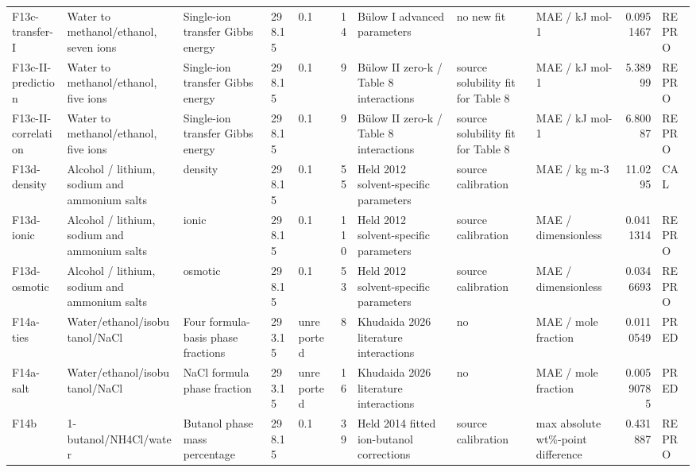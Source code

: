 \begin{landscape}
\begin{longtable}{L{1.9cm}L{2.5cm}L{2.1cm}L{1.6cm}L{1.6cm}rL{2.4cm}L{1.9cm}L{2.2cm}rL{1cm}}
F13c-\allowbreak{}transfer-\allowbreak{}I & Water to methanol/\allowbreak{}ethanol, seven ions & Single-\allowbreak{}ion transfer Gibbs energy & 298.15 & 0.1 & 14 & Bülow I advanced parameters & no new fit & MAE /\allowbreak{} kJ mol-\allowbreak{}1 & 0.0951467 & REPRO \\
F13c-\allowbreak{}II-\allowbreak{}prediction & Water to methanol/\allowbreak{}ethanol, five ions & Single-\allowbreak{}ion transfer Gibbs energy & 298.15 & 0.1 & 9 & Bülow II zero-\allowbreak{}k /\allowbreak{} Table 8 interactions & source solubility fit for Table 8 & MAE /\allowbreak{} kJ mol-\allowbreak{}1 & 5.38999 & REPRO \\
F13c-\allowbreak{}II-\allowbreak{}correlation & Water to methanol/\allowbreak{}ethanol, five ions & Single-\allowbreak{}ion transfer Gibbs energy & 298.15 & 0.1 & 9 & Bülow II zero-\allowbreak{}k /\allowbreak{} Table 8 interactions & source solubility fit for Table 8 & MAE /\allowbreak{} kJ mol-\allowbreak{}1 & 6.80087 & REPRO \\
F13d-\allowbreak{}density & Alcohol /\allowbreak{} lithium, sodium and ammonium salts & density & 298.15 & 0.1 & 55 & Held 2012 solvent-\allowbreak{}specific parameters & source calibration & MAE /\allowbreak{} kg m-\allowbreak{}3 & 11.0295 & CAL \\
F13d-\allowbreak{}ionic & Alcohol /\allowbreak{} lithium, sodium and ammonium salts & ionic & 298.15 & 0.1 & 110 & Held 2012 solvent-\allowbreak{}specific parameters & source calibration & MAE /\allowbreak{} dimensionless & 0.0411314 & REPRO \\
F13d-\allowbreak{}osmotic & Alcohol /\allowbreak{} lithium, sodium and ammonium salts & osmotic & 298.15 & 0.1 & 53 & Held 2012 solvent-\allowbreak{}specific parameters & source calibration & MAE /\allowbreak{} dimensionless & 0.0346693 & REPRO \\
F14a-\allowbreak{}ties & Water/\allowbreak{}ethanol/\allowbreak{}isobutanol/\allowbreak{}NaCl & Four formula-\allowbreak{}basis phase fractions & 293.15 & unreported & 8 & Khudaida 2026 literature interactions & no & MAE /\allowbreak{} mole fraction & 0.0110549 & PRED \\
F14a-\allowbreak{}salt & Water/\allowbreak{}ethanol/\allowbreak{}isobutanol/\allowbreak{}NaCl & NaCl formula phase fraction & 293.15 & unreported & 16 & Khudaida 2026 literature interactions & no & MAE /\allowbreak{} mole fraction & 0.00590785 & PRED \\
F14b & 1-\allowbreak{}butanol/\allowbreak{}NH4Cl/\allowbreak{}water & Butanol phase mass percentage & 298.15 & 0.1 & 39 & Held 2014 fitted ion-\allowbreak{}butanol corrections & source calibration & max absolute wt\%-\allowbreak{}point difference & 0.431887 & REPRO \\

\end{longtable}
\end{landscape}
